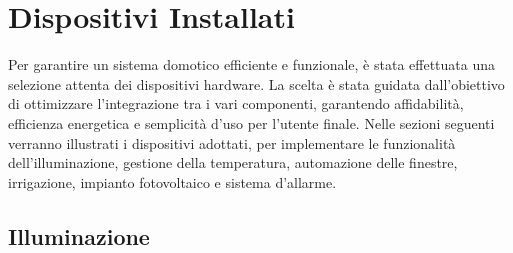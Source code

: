 \documentclass[italian, 12pt, a4paper]{article}
\begin{document}
\section{Dispositivi Installati}
Per garantire un sistema domotico efficiente e funzionale, è stata effettuata una selezione attenta dei dispositivi hardware. La scelta è stata guidata dall’obiettivo di ottimizzare l’integrazione tra i vari componenti, garantendo affidabilità, efficienza energetica e semplicità d’uso per l’utente finale.
Nelle sezioni seguenti verranno illustrati i dispositivi adottati, per implementare le funzionalità dell'illuminazione, gestione della temperatura, automazione delle finestre, irrigazione, impianto fotovoltaico e sistema d'allarme.
\subsection{Illuminazione}
\end{document}
